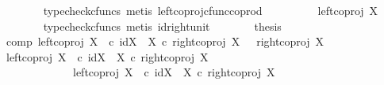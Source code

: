 \begin{isabellebody}
\ \ \ \ \ \ \isamarkupfalse%
\ {\isacharparenleft}{\kern0pt}typecheck{\isacharunderscore}{\kern0pt}cfuncs{\isacharcomma}{\kern0pt}\ metis\ left{\isacharunderscore}{\kern0pt}coproj{\isacharunderscore}{\kern0pt}cfunc{\isacharunderscore}{\kern0pt}coprod{\isacharparenright}{\kern0pt}\isanewline
\ \ \ \ \isamarkupfalse%
\ \isamarkupfalse%
\ {\isachardoublequoteopen}{\isachardot}{\kern0pt}{\isachardot}{\kern0pt}{\isachardot}{\kern0pt}\ {\isacharequal}{\kern0pt}\ left{\isacharunderscore}{\kern0pt}coproj\ X\ {\isasymemptyset}{\isachardoublequoteclose}\isanewline
\ \ \ \ \ \ \isamarkupfalse%
\ {\isacharparenleft}{\kern0pt}typecheck{\isacharunderscore}{\kern0pt}cfuncs{\isacharcomma}{\kern0pt}\ metis\ id{\isacharunderscore}{\kern0pt}right{\isacharunderscore}{\kern0pt}unit{}{\isacharparenright}{\kern0pt}\isanewline
\ \ \ \ \isamarkupfalse%
\ \isamarkupfalse%
\ {\isacharquery}{\kern0pt}thesis\isacommand{{\isachardot}{\kern0pt}}\isamarkupfalse%
\isanewline
\ \ \isamarkupfalse%
\isanewline
\ \ \isamarkupfalse%
\ comp{}{\isacharcolon}{\kern0pt}\ {\isachardoublequoteopen}{\isacharparenleft}{\kern0pt}left{\isacharunderscore}{\kern0pt}coproj\ X\ {\isasymemptyset}\ {\isasymcirc}\isactrlsub c\ {\isacharparenleft}{\kern0pt}id{\isacharparenleft}{\kern0pt}X{\isacharparenright}{\kern0pt}\ {\isasymamalg}\ {\isasymalpha}\isactrlbsub X\isactrlesub {\isacharparenright}{\kern0pt}{\isacharparenright}{\kern0pt}\ {\isasymcirc}\isactrlsub c\ right{\isacharunderscore}{\kern0pt}coproj\ X\ {\isasymemptyset}\ {\isacharequal}{\kern0pt}\ right{\isacharunderscore}{\kern0pt}coproj\ X\ {\isasymemptyset}{\isachardoublequoteclose}\isanewline
\ \ \isamarkupfalse%
\ {\isacharminus}{\kern0pt}\isanewline
\ \ \ \ \isamarkupfalse%
\ {\isachardoublequoteopen}{\isacharparenleft}{\kern0pt}{\isacharparenleft}{\kern0pt}left{\isacharunderscore}{\kern0pt}coproj\ X\ {\isasymemptyset}{\isacharparenright}{\kern0pt}\ {\isasymcirc}\isactrlsub c\ {\isacharparenleft}{\kern0pt}id{\isacharparenleft}{\kern0pt}X{\isacharparenright}{\kern0pt}\ {\isasymamalg}\ {\isasymalpha}\isactrlbsub X\isactrlesub {\isacharparenright}{\kern0pt}{\isacharparenright}{\kern0pt}\ {\isasymcirc}\isactrlsub c\ {\isacharparenleft}{\kern0pt}right{\isacharunderscore}{\kern0pt}coproj\ X\ {\isasymemptyset}{\isacharparenright}{\kern0pt}\ {\isacharequal}{\kern0pt}\ \isanewline
\ \ \ \ \ \ \ \ \ \ \ \ \ {\isacharparenleft}{\kern0pt}left{\isacharunderscore}{\kern0pt}coproj\ X\ {\isasymemptyset}{\isacharparenright}{\kern0pt}\ {\isasymcirc}\isactrlsub c\ {\isacharparenleft}{\kern0pt}{\isacharparenleft}{\kern0pt}id{\isacharparenleft}{\kern0pt}X{\isacharparenright}{\kern0pt}\ {\isasymamalg}\ {\isasymalpha}\isactrlbsub X\isactrlesub {\isacharparenright}{\kern0pt}\ {\isasymcirc}\isactrlsub c\ {\isacharparenleft}{\kern0pt}right{\isacharunderscore}{\kern0pt}coproj\ X\ {\isasymemptyset}{\isacharparenright}{\kern0pt}{\isacharparenright}{\kern0pt}{\isachardoublequoteclose}\isanewline

\end{isabellebody}
